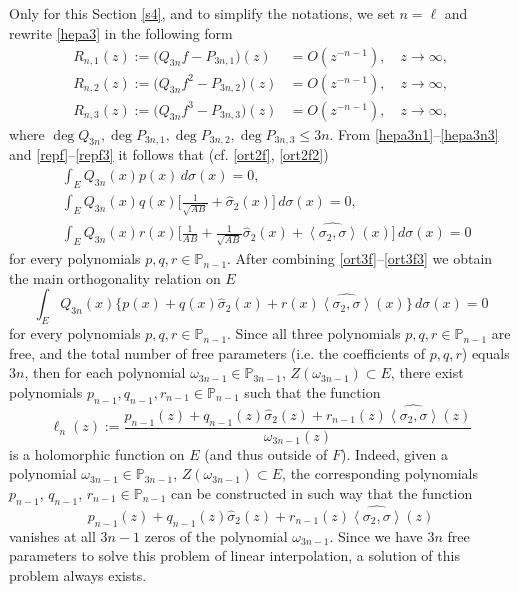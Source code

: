 \documentclass[11pt, a4paper, twoside]{article}
\def\<{\left\langle}
\def\>{\right\rangle}
\let\leq\leqslant
\let\myh\widehat
\def\PP{\mathbb P}
\def\mdeg{\operatorname{deg}}
\theoremstyle{plain}
\theoremstyle{definition}
\begin{document}
\subsection{}\label{s4s1}
Only for this Section \ref{s4}, and to simplify the notations,
we set $n=\ell$ and rewrite \eqref{hepa3} in the following form
\begin{align}
R_{n,1}(z):=
\bigl(Q_{3n}f-P_{3n,1}\bigr)(z)
&=O(z^{-n-1}),\quad z\to\infty,
\label{hepa3n1}\\
R_{n,2}(z):=
\bigl(Q_{3n}f^2-P_{3n,2}\bigr)(z)
&=O(z^{-n-1}),\quad z\to\infty,
\label{hepa3n2}\\
R_{n,3}(z):=
\bigl(Q_{3n}f^3-P_{3n,3}\bigr)(z)
&=O(z^{-n-1}),\quad z\to\infty,
\label{hepa3n3}
\end{align}
where $\mdeg{Q_{3n}},\mdeg{P_{3n,1}},\mdeg{P_{3n,2}},\mdeg{P_{3n,3}}\leq{3n}$.
From \eqref{hepa3n1}--\eqref{hepa3n3} and \eqref{repf}--\eqref{repf3} it follows that (cf. \eqref{ort2f}, \eqref{ort2f2}) 
\begin{align}
&\int_E Q_{3n}(x)p(x)\,d\sigma(x)=0,\label{ort3f}\\
&\int_E Q_{3n}(x)q(x)\biggl[\frac1{\sqrt{AB}}+\myh{\sigma}_2(x)\biggr]\,d\sigma(x)=0,\label{ort3f2}\\
&\int_E Q_{3n}(x)r(x)\biggl[\frac1{AB}+\frac1{\sqrt{AB}}\myh{\sigma}_2(x)+\myh{\<\sigma_2,\sigma\>}(x)\biggr]\,d\sigma(x)=0\label{ort3f3}
\end{align}
for every polynomials $p,q,r\in\PP_{n-1}$. After combining \eqref{ort3f}--\eqref{ort3f3} we obtain the main orthogonality relation on $E$
\begin{equation}
\int_E Q_{3n}(x)\biggl\{
p(x)+q(x)\myh{\sigma}_2(x)+r(x)\myh{\<\sigma_2,\sigma\>}(x)\biggr\}\,d\sigma(x)=0
\label{ort3m}
\end{equation}
for every polynomials $p,q,r\in\PP_{n-1}$. Since all three polynomials $p,q,r\in\PP_{n-1}$ are free, and the total number of free parameters (i.e. the coefficients of $p,q,r$) equals $3n$, then for each  polynomial $\omega_{3n-1}\in\PP_{3n-1}$, $Z(\omega_{3n-1})\subset E$, there exist polynomials $p_{n-1},q_{n-1},r_{n-1}\in\PP_{n-1}$ such that the function
\begin{equation}
\ell_n(z):=\frac{
p_{n-1}(z)+q_{n-1}(z)\myh{\sigma}_2(z)+r_{n-1}(z)\myh{\<\sigma_2,\sigma\>}(z)}{\omega_{3n-1}(z)}
\label{form3l}
\end{equation}
is a holomorphic function on $E$ (and thus outside of $F$). Indeed, given a polynomial $\omega_{3n-1}\in\PP_{3n-1}$, $Z(\omega_{3n-1})\subset E$, the corresponding polynomials $p_{n-1}$, $q_{n-1}$, $r_{n-1}\in\PP_{n-1}$ can be constructed in such way that the function 
$$
p_{n-1}(z)+q_{n-1}(z)\myh{\sigma}_2(z)+r_{n-1}(z)\myh{\<\sigma_2,\sigma\>}(z)
$$
vanishes at all $3n-1$ zeros of the polynomial $\omega_{3n-1}$. Since we have $3n$ free parameters to solve this problem of linear interpolation, a solution of this problem always exists.
\end{document}
